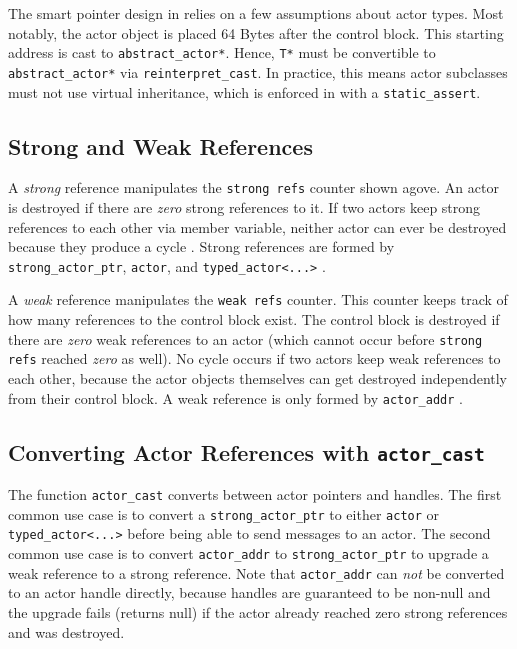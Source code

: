 The smart pointer design in \lib relies on a few assumptions about actor types. Most notably, the actor object is placed 64 Bytes after the control block. This starting address is cast to \lstinline^abstract_actor*^. Hence, \lstinline^T*^ must be convertible to \lstinline^abstract_actor*^ via \lstinline^reinterpret_cast^. In practice, this means actor subclasses must not use virtual inheritance, which is enforced in \lib with a \lstinline^static_assert^.

\subsection{Strong and Weak References}

A \emph{strong} reference manipulates the \lstinline^strong refs^ counter shown agove. An actor is destroyed if there are \emph{zero} strong references to it. If two actors keep strong references to each other via member variable, neither actor can ever be destroyed because they produce a cycle . Strong references are formed by \lstinline^strong_actor_ptr^, \lstinline^actor^, and \lstinline^typed_actor<...>^ .

A \emph{weak} reference manipulates the \lstinline^weak refs^ counter. This counter keeps track of how many references to the control block exist. The control block is destroyed if there are \emph{zero} weak references to an actor (which cannot occur before \lstinline^strong refs^ reached \emph{zero} as well). No cycle occurs if two actors keep weak references to each other, because the actor objects themselves can get destroyed independently from their control block.  A weak reference is only formed by \lstinline^actor_addr^ .

\subsection{Converting Actor References with \texttt{actor\_cast}}

The function \lstinline^actor_cast^ converts between actor pointers and handles. The first common use case is to convert a \lstinline^strong_actor_ptr^ to either \lstinline^actor^ or \lstinline^typed_actor<...>^ before being able to send messages to an actor. The second common use case is to convert \lstinline^actor_addr^ to \lstinline^strong_actor_ptr^ to upgrade a weak reference to a strong reference. Note that \lstinline^actor_addr^ can \emph{not} be converted to an actor handle directly, because handles are guaranteed to be non-null and the upgrade fails (returns null) if the actor already reached zero strong references and was destroyed.

